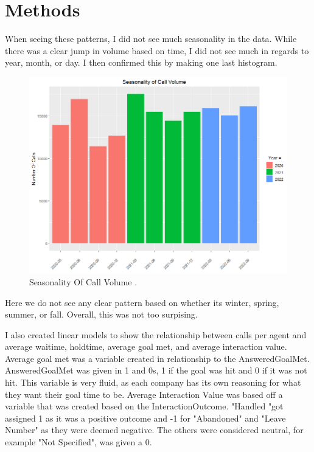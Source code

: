 \documentclass[12pt]{article}
\begin{document}
\section*{Methods}
When seeing these patterns, I did not see much seasonality in the data. While there was a clear jump in volume based on time, I did not see much in regards
to year, month, or day. I then confirmed this by making one last histogram.
\begin{figure}[H]
  \centering
  \includegraphics[width=\textwidth]{SeasonalityOfCallVolume.png}
  \caption{Seasonality Of Call Volume .}
  \label{fig:Seasonality}
\end{figure}
Here we do not see any clear pattern based on whether its winter, spring, summer, or fall. Overall, this was not too surpising.

I also created linear models to show the relationship between calls per agent and average waitime, holdtime, average goal met, and average 
interaction value. Average goal met was a variable created in relationship to the AnsweredGoalMet. AnsweredGoalMet was given in 1 and 0s, 
1 if the goal was hit and 0 if it was not hit. This variable is very fluid, as each company has its own reasoning for what they want their
goal time to be. Average Interaction Value was based off a variable that was created based on the InteractionOutcome. "Handled "got assigned 
1 as it was a positive outcome and -1 for "Abandoned" and "Leave Number" as they were deemed negative. The others were considered neutral, for example
"Not Specified", was given a 0. 
\end{document}
